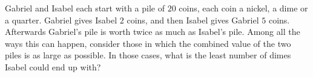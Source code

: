 Gabriel and Isabel each start with a pile of $20$ coins, each coin a nickel, a dime or a quarter. Gabriel gives Isabel $2$ coins, and then Isabel gives Gabriel $5$ coins. Afterwards Gabriel's pile is worth twice as much as Isabel's pile. Among all the ways this can happen, consider those in which the combined value of the two piles is as large as possible. In those cases, what is the least number of dimes Isabel could end up with?
